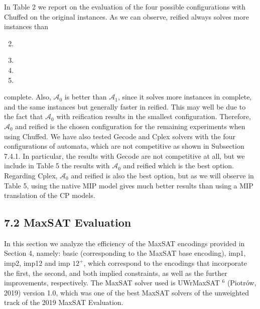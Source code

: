 \documentclass[10pt]{article}
\begin{document}
In Table 2 we report on the evaluation of the four possible configurations with Chuffed on the original instances. As we can observe, reified always solves more instances than

\begin{enumerate}
  \setcounter{enumi}{1}
  \item 
\end{enumerate}

\begin{enumerate}
  \setcounter{enumi}{2}
  \item 
  \item 
  \item 
\end{enumerate}
\captionsetup{singlelinecheck=false}
complete. Also, $\mathcal{A}_{0}$ is better than $\mathcal{A}_{1}$, since it solves more instances in complete, and the same instances but generally faster in reified. This may well be due to the fact that $\mathcal{A}_{0}$ with reification results in the smallest configuration. Therefore, $\mathcal{A}_{0}$ and reified is the chosen configuration for the remaining experiments when using Chuffed. We have also tested Gecode and Cplex solvers with the four configurations of automata, which are not competitive as shown in Subsection 7.4.1. In particular, the results with Gecode are not competitive at all, but we include in Table 5 the results with $\mathcal{A}_{0}$ and reified which is the best option. Regarding Cplex, $\mathcal{A}_{0}$ and reified is also the best option, but as we will observe in Table 5, using the native MIP model gives much better results than using a MIP translation of the CP models.

\subsection*{7.2 MaxSAT Evaluation}
In this section we analyze the efficiency of the MaxSAT encodings provided in Section 4, namely: basic (corresponding to the MaxSAT base encoding), imp1, imp2, imp12 and imp $12^{+}$, which correspond to the encodings that incorporate the first, the second, and both implied constraints, as well as the further improvements, respectively. The MaxSAT solver used is UWrMaxSAT ${ }^{6}$ (Piotrów, 2019) version 1.0, which was one of the best MaxSAT solvers of the unweighted track of the 2019 MaxSAT Evaluation.
\end{document}
